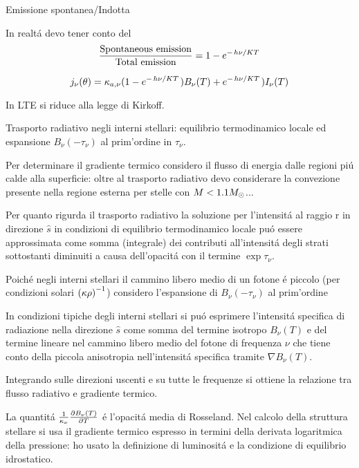 \documentclass[10pt,xcolor={usenames},fleqn,mathserif,serif]{beamer}
\begin{document}
\begin{wordonframe}{Emissione spontanea/Indotta}

In realt\'a devo tener conto del\[\frac{\text{Spontaneous emission}}{\text{Total emission}}=1-\exp{-\midfrac{h\nu}{KT}}\]

\[j_{\nu}(\theta)=\kappa_{a,\nu}(1-\exp{-\midfrac{h\nu}{KT}})B_{\nu}(T)+\exp{-\midfrac{h\nu}{KT}})I_{\nu}(T)\]

In LTE si riduce alla legge di Kirkoff.

\end{wordonframe}

\begin{wordonframe}{Trasporto radiativo negli interni stellari: equilibrio termodinamico locale ed espansione $B_{\nu}(-\tau_{\nu})$ al prim'ordine in $\tau_{\nu}$.}

{\small

Per determinare il gradiente termico considero il flusso di energia dalle regioni pi\'u calde alla superficie: oltre al trasporto radiativo devo considerare la convezione presente nella regione esterna per stelle con $M<1.1\msun{}$...

Per quanto rigurda il trasporto radiativo la soluzione per l'intensit\'a al raggio r in direzione $\hat{s}$ in condizioni di equilibrio termodinamico locale pu\'o essere approssimata come somma (integrale) dei contributi all'intensit\'a  degli strati sottostanti diminuiti a causa dell'opacit\'a con il termine $\exp{\tau_{\nu}}$.

Poich\'e negli interni stellari il cammino libero medio di un fotone \'e piccolo (per condizioni solari $\invers{(\kappa\rho)}$) considero l'espansione di $B_{\nu}(-\tau_{\nu})$ al prim'ordine

In condizioni tipiche degli interni stellari si pu\'o esprimere l'intensit\'a specifica di radiazione nella direzione $\hat{s}$ come somma del termine isotropo $B_{\nu}(T)$ e del termine lineare nel cammino libero medio del fotone di frequenza $\nu$ che tiene conto della piccola anisotropia nell'intensit\'a specifica tramite $\nabla B_{\nu}(T)$.

Integrando sulle direzioni uscenti e su tutte le frequenze si ottiene la relazione tra flusso radiativo e gradiente termico.

La quantit\'a $\frac{1}{\kappa_{\nu}}\PDy{T}{B_{\nu}(T)}$ \'e l'opacit\'a media di Rosseland. Nel calcolo della struttura stellare si usa il gradiente termico espresso in termini della derivata logaritmica della pressione: ho usato la definizione di luminosit\'a e la condizione di equilibrio idrostatico.

}

\end{wordonframe}
\end{document}
